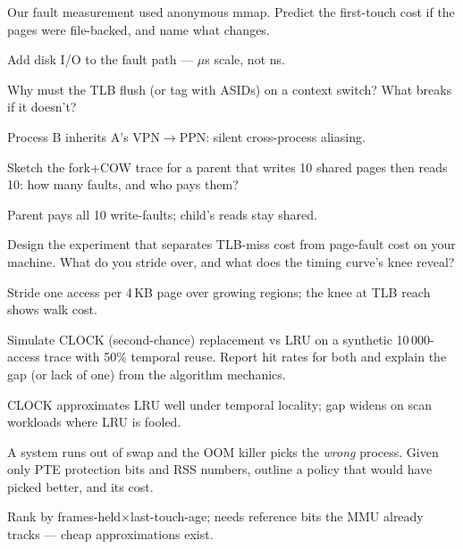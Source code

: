 \begin{exercise}[medium]
Our fault measurement used anonymous mmap. Predict the first-touch
cost if the pages were file-backed, and name what changes.
\end{exercise}
\begin{solution}[hint]
Add disk I/O to the fault path --- $\mu$s scale, not ns.
\end{solution}

\begin{exercise}[medium]
Why must the TLB flush (or tag with ASIDs) on a context switch?
What breaks if it doesn't?
\end{exercise}
\begin{solution}[hint]
Process B inherits A's VPN$\to$PPN: silent cross-process aliasing.
\end{solution}

\begin{exercise}[medium]
Sketch the fork+COW trace for a parent that writes 10 shared pages
then reads 10: how many faults, and who pays them?
\end{exercise}
\begin{solution}[hint]
Parent pays all 10 write-faults; child's reads stay shared.
\end{solution}

\begin{exercise}[medium]
Design the experiment that separates TLB-miss cost from
page-fault cost on your machine. What do you stride over, and what
does the timing curve's knee reveal?
\end{exercise}
\begin{solution}[hint]
Stride one access per 4\,KB page over growing regions; the knee at
TLB reach shows walk cost.
\end{solution}

\begin{exercise}[hard]
Simulate CLOCK (second-chance) replacement vs LRU on a synthetic
10\,000-access trace with 50\% temporal reuse. Report hit rates for
both and explain the gap (or lack of one) from the algorithm
mechanics.
\end{exercise}
\begin{solution}[hint]
CLOCK approximates LRU well under temporal locality; gap widens on
scan workloads where LRU is fooled.
\end{solution}

\begin{exercise}[hard]
A system runs out of swap and the OOM killer picks the
\emph{wrong} process. Given only PTE protection bits and RSS
numbers, outline a policy that would have picked better, and its
cost.
\end{exercise}
\begin{solution}[hint]
Rank by frames-held$\times$last-touch-age; needs reference bits the
MMU already tracks --- cheap approximations exist.
\end{solution}

